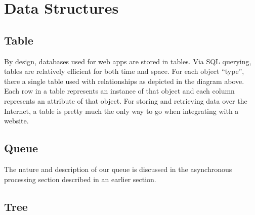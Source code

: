 \chapter{Data Structures}

\section{Table}
By design, databases used for web apps are stored in tables. Via SQL querying, tables are relatively efficient for both time and space. For each object ``type'', there a single table used with relationships as depicted in the diagram above. Each row in a table represents an instance of that object and each column represents an attribute of that object. For storing and retrieving data over the Internet, a table is pretty much the only way to go when integrating with a website.

\section{Queue}
The nature and description of our queue is discussed in the asynchronous processing section described in an earlier section.

\section{Tree}

